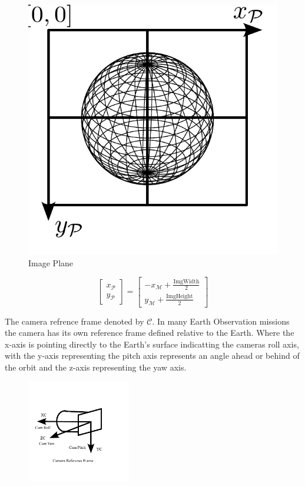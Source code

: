 \begin{figure}[H]
    \centering
    \includegraphics[width=0.5\linewidth]{figures/imageprocessing/ImagePlane.pdf}
    \caption{Image Plane}
    \label{fig4.2}
\end{figure}

\begin{equation}
\begin{bmatrix}
x_\mathcal{P} \\
y_\mathcal{P}
\end{bmatrix}
=
\begin{bmatrix}
    -x_\mathcal{M} + \frac{\text{ImgWidth}}{2} \\
    y_\mathcal{M} + \frac{\text{ImgHeight}}{2}
\end{bmatrix}
\end{equation}


The camera refrence frame denoted by $\mathcal{C}$. In many Earth Observation missions the camera has its own reference frame defined relative to the Earth. Where the x-axis is
pointing directly to the Earth's surface indicatting the cameras roll axis, with the y-axis representing the pitch axis represents an angle ahead or behind of the orbit and the
z-axis representing the yaw axis.


\begin{figure}[H]
    \centering
    \includegraphics[width=0.4\textwidth]{figures/modelling/CRF.pdf}
    \caption{}
    \label{fig:CRF}
\end{figure}

